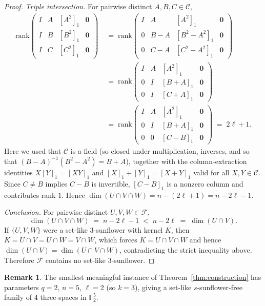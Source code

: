\documentclass[11pt]{article}
\theoremstyle{definition}
\newtheorem{remark}[theorem]{Remark}
\newcommand{\F}{\mathbb{F}}
\begin{document}
\begin{proof}
\textit{Triple intersection.} For pairwise distinct $A, B, C \in \mathcal{C}$,
\begin{align*}
\mathrm{rank}\begin{pmatrix} I & A & [A^2]_1 & \mathbf{0} \\ I & B & [B^2]_1 & \mathbf{0} \\ I & C & [C^2]_1 & \mathbf{0} \end{pmatrix}
&\;=\; \mathrm{rank}\begin{pmatrix} I & A & [A^2]_1 & \mathbf{0} \\ 0 & B - A & [B^2 - A^2]_1 & \mathbf{0} \\ 0 & C - A & [C^2 - A^2]_1 & \mathbf{0} \end{pmatrix} \\
&\;=\; \mathrm{rank}\begin{pmatrix} I & A & [A^2]_1 & \mathbf{0} \\ 0 & I & [B + A]_1 & \mathbf{0} \\ 0 & I & [C + A]_1 & \mathbf{0} \end{pmatrix} \\
&\;=\; \mathrm{rank}\begin{pmatrix} I & A & [A^2]_1 & \mathbf{0} \\ 0 & I & [B + A]_1 & \mathbf{0} \\ 0 & 0 & [C - B]_1 & \mathbf{0} \end{pmatrix} \;=\; 2\ell + 1.
\end{align*}
Here we used that $\mathcal{C}$ is a field (so closed under multiplication, inverses, and so that $(B-A)^{-1}(B^2 - A^2) = B + A$), together with the column-extraction identities $X[Y]_1 = [XY]_1$ and $[X]_1 + [Y]_1 = [X+Y]_1$ valid for all $X, Y \in \mathcal{C}$. Since $C \neq B$ implies $C - B$ is invertible, $[C-B]_1$ is a nonzero column and contributes rank $1$. Hence $\dim(U \cap V \cap W) = n - (2\ell + 1) = n - 2\ell - 1$.

\textit{Conclusion.} For pairwise distinct $U, V, W \in \mathcal{F}$,
\[
\dim(U \cap V \cap W) \;=\; n - 2\ell - 1 \;<\; n - 2\ell \;=\; \dim(U \cap V).
\]
If $\{U, V, W\}$ were a set-like $3$-sunflower with kernel $K$, then $K = U \cap V = U \cap W = V \cap W$, which forces $K = U \cap V \cap W$ and hence $\dim(U \cap V) = \dim(U \cap V \cap W)$, contradicting the strict inequality above. Therefore $\mathcal{F}$ contains no set-like $3$-sunflower.
\end{proof}

\begin{remark}
The smallest meaningful instance of Theorem~\ref{thm:construction} has parameters $q = 2$, $n = 5$, $\ell = 2$ (so $k = 3$), giving a set-like $s$-sunflower-free family of $4$ three-spaces in $\F_2^5$.
\end{remark}
\end{document}
